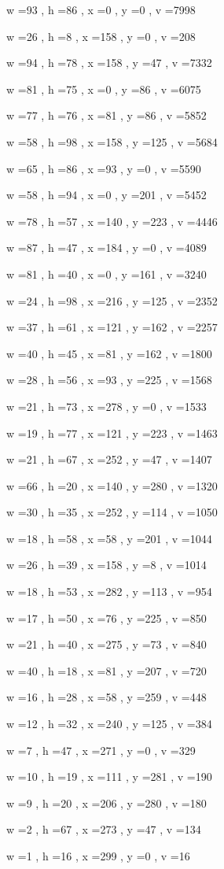 \documentclass[11pt]{article}
\begin{document}
w =93 , h =86 , x =0 , y =0 , v =7998
\par
w =26 , h =8 , x =158 , y =0 , v =208
\par
w =94 , h =78 , x =158 , y =47 , v =7332
\par
w =81 , h =75 , x =0 , y =86 , v =6075
\par
w =77 , h =76 , x =81 , y =86 , v =5852
\par
w =58 , h =98 , x =158 , y =125 , v =5684
\par
w =65 , h =86 , x =93 , y =0 , v =5590
\par
w =58 , h =94 , x =0 , y =201 , v =5452
\par
w =78 , h =57 , x =140 , y =223 , v =4446
\par
w =87 , h =47 , x =184 , y =0 , v =4089
\par
w =81 , h =40 , x =0 , y =161 , v =3240
\par
w =24 , h =98 , x =216 , y =125 , v =2352
\par
w =37 , h =61 , x =121 , y =162 , v =2257
\par
w =40 , h =45 , x =81 , y =162 , v =1800
\par
w =28 , h =56 , x =93 , y =225 , v =1568
\par
w =21 , h =73 , x =278 , y =0 , v =1533
\par
w =19 , h =77 , x =121 , y =223 , v =1463
\par
w =21 , h =67 , x =252 , y =47 , v =1407
\par
w =66 , h =20 , x =140 , y =280 , v =1320
\par
w =30 , h =35 , x =252 , y =114 , v =1050
\par
w =18 , h =58 , x =58 , y =201 , v =1044
\par
w =26 , h =39 , x =158 , y =8 , v =1014
\par
w =18 , h =53 , x =282 , y =113 , v =954
\par
w =17 , h =50 , x =76 , y =225 , v =850
\par
w =21 , h =40 , x =275 , y =73 , v =840
\par
w =40 , h =18 , x =81 , y =207 , v =720
\par
w =16 , h =28 , x =58 , y =259 , v =448
\par
w =12 , h =32 , x =240 , y =125 , v =384
\par
w =7 , h =47 , x =271 , y =0 , v =329
\par
w =10 , h =19 , x =111 , y =281 , v =190
\par
w =9 , h =20 , x =206 , y =280 , v =180
\par
w =2 , h =67 , x =273 , y =47 , v =134
\par
w =1 , h =16 , x =299 , y =0 , v =16
\par
\newpage
\end{document}
